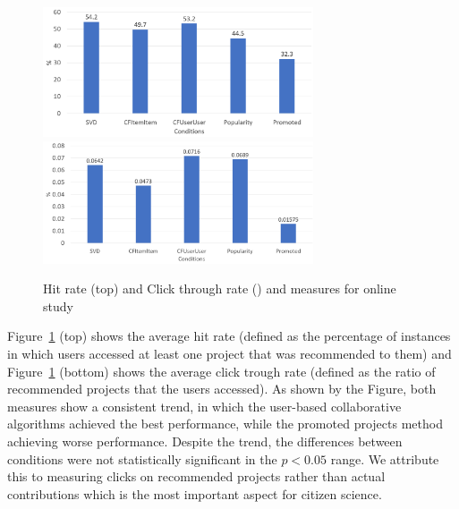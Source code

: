 \documentclass[letterpaper]{article} %
\begin{document}
\begin{figure}[t]
     \centering
    \includegraphics[width=8cm]{Figs/ctr.png} 
        \includegraphics[width=8cm]{Figs/hit.png} 
    \caption{Hit rate  (top) and Click through rate () and measures for  online study}
     \label{fig:hit}%
 \end{figure}

  Figure~\ref{fig:hit} (top) shows the  average hit rate (defined as the  percentage of instances in which users accessed at least one project that was recommended 
  to them) and Figure~\ref{fig:hit} (bottom)  shows the  average click trough rate (defined as the ratio of recommended  
  projects that the users accessed). As shown by the Figure, both  measures show a consistent trend, in which the 
  user-based collaborative algorithms achieved the best performance, while the  promoted projects method achieving 
  worse performance. Despite the trend, the differences between conditions were not statistically 
  significant in the $p<0.05$ range. We attribute this  to measuring  clicks on recommended projects rather than  actual contributions 
  which is the most important aspect for citizen science. 
\end{document}
